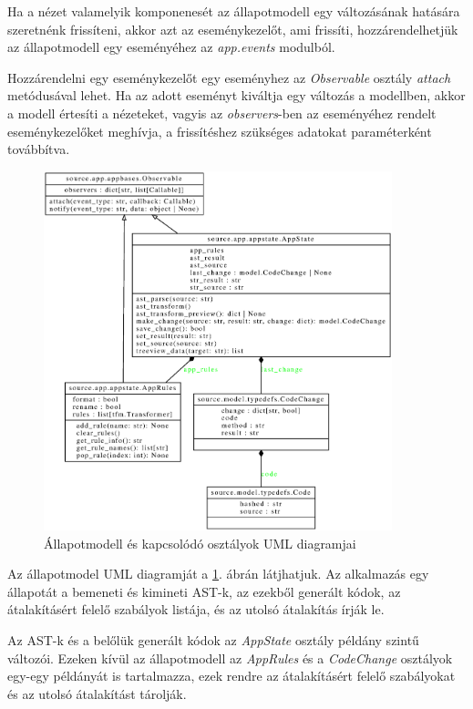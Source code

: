 Ha a nézet valamelyik komponenesét az állapotmodell egy változásának hatására szeretnénk frissíteni,
akkor azt az eseménykezelőt, ami frissíti,
hozzárendelhetjük az állapotmodell egy eseményéhez az \emph{app.events} modulból.

Hozzárendelni egy eseménykezelőt egy eseményhez az \emph{Observable} osztály
\emph{attach} metódusával lehet.
Ha az adott eseményt kiváltja egy változás a modellben, akkor a modell értesíti a
nézeteket,
vagyis az \emph{observers}-ben az eseményéhez rendelt eseménykezelőket meghívja,
a frissítéshez szükséges adatokat paraméterként továbbítva.

\begin{figure}[H]
	\centering
	\includegraphics[width=0.9\textwidth]{images/uml/appstate.eps}
	\caption{\label{fig:AppState}Állapotmodell és kapcsolódó osztályok UML diagramjai}
\end{figure}

Az állapotmodel UML diagramját a \ref{fig:AppState}. ábrán látjhatjuk.
Az alkalmazás egy állapotát a bemeneti és kimineti AST-k, az ezekből generált kódok,
az átalakításért felelő szabályok listája, és az utolsó átalakítás írják le.

Az AST-k és a belőlük generált kódok az \emph{AppState} osztály példány szintű változói.
Ezeken kívül az állapotmodell az \emph{AppRules} és a \emph{CodeChange} osztályok egy-egy
példányát
is tartalmazza, ezek rendre az átalakításért felelő szabályokat és az utolsó átalakítást
tárolják.

